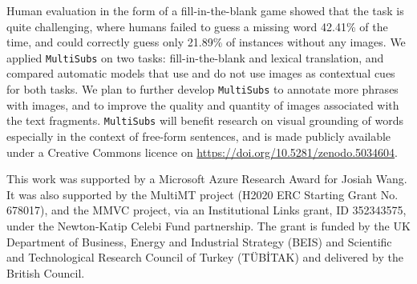 \documentclass[twocolumn]{svjour3}          \smartqed  \usepackage{graphicx}
\newcommand{\multisubs}{\texttt{MultiSubs}\xspace}
\begin{document}
Human evaluation in the form of a fill-in-the-blank game showed that the task is quite challenging, where humans failed to guess a missing word 42.41\% of the time, and could correctly guess only 21.89\% of instances without any images. We applied \multisubs on two tasks:  fill-in-the-blank and lexical translation, and compared automatic models that use and do not use images as contextual cues for both tasks. We plan to further develop \multisubs to annotate more phrases with images, and to improve the quality and quantity of images associated with the text fragments. \multisubs will benefit research on visual grounding of words especially in the context of free-form sentences, and is made publicly available under a Creative Commons licence on \url{https://doi.org/10.5281/zenodo.5034604}.

\begin{acknowledgements}
This work was supported by a Microsoft Azure Research Award for Josiah Wang. It was also supported by the MultiMT project (H2020 ERC Starting Grant No. 678017), and the MMVC project, via an Institutional Links grant, ID 352343575, under the Newton-Katip Celebi Fund partnership. The grant is funded by the UK Department of Business, Energy and Industrial Strategy (BEIS) and Scientific and Technological Research Council of Turkey (T{\"U}B{\.I}TAK) and delivered by the British Council. 
\end{acknowledgements}

         
\end{document}
